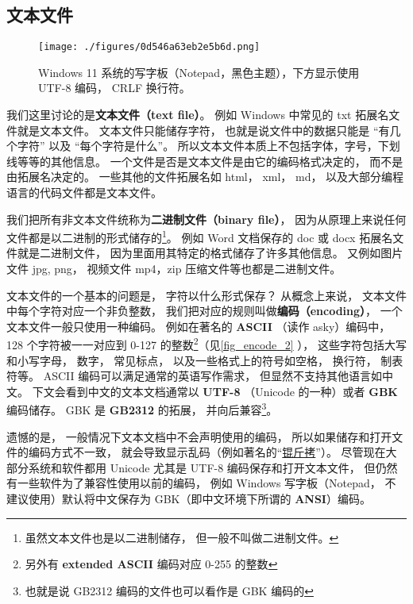 
\subsection{文本文件}
\begin{figure}[ht]
\centering
\texttt{[image: ./figures/0d546a63eb2e5b6d.png]}
\caption{Windows 11 系统的写字板（Notepad，黑色主题），下方显示使用 UTF-8 编码， CRLF 换行符。} \label{fig_encode_3}
\end{figure}

我们这里讨论的是\textbf{文本文件（text file）}。 例如 Windows 中常见的 txt 拓展名文件就是文本文件。 文本文件只能储存字符， 也就是说文件中的数据只能是 “有几个字符” 以及 “每个字符是什么”。 所以文本文件本质上不包括字体，字号，下划线等等的其他信息。 一个文件是否是文本文件是由它的编码格式决定的， 而不是由拓展名决定的。 一些其他的文件拓展名如 html， xml， md， 以及大部分编程语言的代码文件都是文本文件。

我们把所有非文本文件统称为\textbf{二进制文件（binary file）}， 因为从原理上来说任何文件都是以二进制的形式储存的\footnote{虽然文本文件也是以二进制储存， 但一般不叫做二进制文件。}。 例如 Word 文档保存的 doc 或 docx 拓展名文件就是二进制文件， 因为里面用其特定的格式储存了许多其他信息。  又例如图片文件 jpg, png， 视频文件 mp4，zip 压缩文件等也都是二进制文件。

文本文件的一个基本的问题是， 字符以什么形式保存？ 从概念上来说， 文本文件中每个字符对应一个非负整数， 我们把对应的规则叫做\textbf{编码（encoding）}， 一个文本文件一般只使用一种编码。 例如在著名的 \textbf{ASCII} （读作 asky）编码中， 128 个字符被一一对应到 0-127 的整数\footnote{另外有 \textbf{extended ASCII} 编码对应 0-255 的整数}（见\autoref{fig_encode_2} ）， 这些字符包括大写和小写字母， 数字， 常见标点， 以及一些格式上的符号如空格， 换行符， 制表符等。 ASCII 编码可以满足通常的英语写作需求， 但显然不支持其他语言如中文。 下文会看到中文的文本文档通常以 \textbf{UTF-8} （Unicode 的一种）或者 \textbf{GBK} 编码储存。 GBK 是 \textbf{GB2312} 的拓展， 并向后兼容\footnote{也就是说 GB2312 编码的文件也可以看作是 GBK 编码的}。

遗憾的是， 一般情况下文本文档中不会声明使用的编码， 所以如果储存和打开文件的编码方式不一致， 就会导致显示乱码（例如著名的“\href{https://baike.baidu.com/item/\%E9\%94\%9F\%E6\%96\%A4\%E6\%8B\%B7}{锟斤拷}”）。 尽管现在大部分系统和软件都用 Unicode 尤其是 UTF-8 编码保存和打开文本文件， 但仍然有一些软件为了兼容性使用以前的编码， 例如 Windows 写字板（Notepad， 不建议使用）默认将中文保存为 GBK（即中文环境下所谓的 \textbf{ANSI}）编码。

